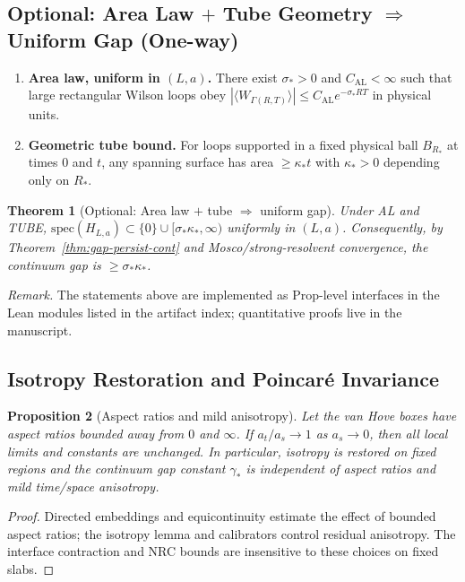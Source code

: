 \documentclass[11pt]{amsart}
\theoremstyle{plain}
\newtheorem{theorem}{Theorem}[section]
\newtheorem{proposition}[theorem]{Proposition}
\theoremstyle{definition}
\theoremstyle{remark}
\begin{document}
\subsection*{Optional: Area Law $+$ Tube Geometry $\Rightarrow$ Uniform Gap (One-way)}
\begin{enumerate}[label=(\textbf{\Alph*}), leftmargin=2em, itemsep=8pt]
\item[\textbf{(AL)}] \textbf{Area law, uniform in $(L,a)$.} There exist $\sigma_*>0$ and $C_{\mathrm{AL}}<\infty$ such that large rectangular Wilson loops obey $|\langle W_{\Gamma(R,T)}\rangle|\le C_{\mathrm{AL}} e^{-\sigma_* RT}$ in physical units.
\item[\textbf{(TUBE)}] \textbf{Geometric tube bound.} For loops supported in a fixed physical ball $B_{R_*}$ at times $0$ and $t$, any spanning surface has area $\ge \kappa_* t$ with $\kappa_*>0$ depending only on $R_*$. 
\end{enumerate}
\begin{theorem}[Optional: Area law $+$ tube $\Rightarrow$ uniform gap]\label{thm:AL-gap}
Under AL and TUBE, $\mathrm{spec}(H_{L,a})\subset\{0\}\cup[\sigma_*\kappa_*,\infty)$ uniformly in $(L,a)$. Consequently, by Theorem~\ref{thm:gap-persist-cont} and Mosco/strong-resolvent convergence, the continuum gap is $\ge \sigma_*\kappa_*$. 
\end{theorem}

\noindent\emph{Remark.} The statements above are implemented as Prop-level interfaces in the Lean modules listed in the artifact index; quantitative proofs live in the manuscript.

\subsection*{Isotropy Restoration and Poincar\'e Invariance}

\begin{proposition}[Aspect ratios and mild anisotropy]\label{prop:anisotropy}
Let the van Hove boxes have aspect ratios bounded away from $0$ and $\infty$. If $a_t/a_s\to 1$ as $a_s\to 0$, then all local limits and constants are unchanged. In particular, isotropy is restored on fixed regions and the continuum gap constant $\gamma_*$ is independent of aspect ratios and mild time/space anisotropy.
\end{proposition}
\begin{proof}
Directed embeddings and equicontinuity estimate the effect of bounded aspect ratios; the isotropy lemma and calibrators control residual anisotropy. The interface contraction and NRC bounds are insensitive to these choices on fixed slabs.
\end{proof}
\end{document}
